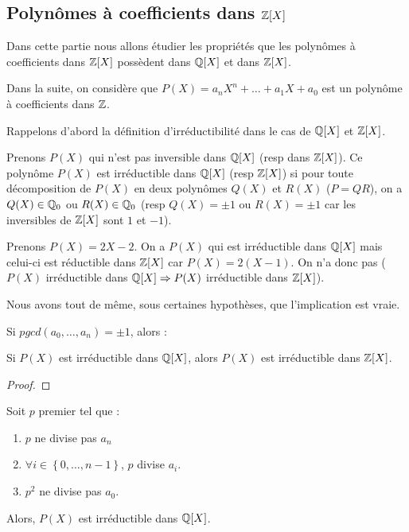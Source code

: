 \subsection{Polynômes à coefficients dans $\mathbb{Z}[X]$}

Dans cette partie nous allons étudier les propriétés que les polynômes à
coefficients dans $\mathbb{Z}[X]$ possèdent dans $\mathbb{Q}[X]$ et dans
$\mathbb{Z}[X]$.


Dans la suite, on considère que $P(X) = a_{n}X^{n} + \ldots + a_{1}X + a_{0}$
est un polynôme à coefficients dans $\mathbb{Z}$.

Rappelons d'abord la définition d'irréductibilité dans le cas de $\mathbb{Q}[X]$
et $\mathbb{Z}[X]$.

Prenons $P(X)$ qui n'est pas inversible dans $\mathbb{Q}[X]$ (resp dans
$\mathbb{Z}[X]$).
Ce polynôme $P(X)$ est irréductible dans $\mathbb{Q}[X]$ (resp $\mathbb{Z}[X]$) si
pour toute décomposition de $P(X)$ en deux polynômes $Q(X)$ et $R(X)$ ($P =
QR$), on a $Q(X) \in \mathbb{Q}_{0}$ ou $R(X) \in \mathbb{Q}_{0}$ (resp $Q(X) = \pm 1$
ou $R(X) = \pm 1$ car les inversibles de $\mathbb{Z}[X]$ sont $1$ et $-1$).

Prenons $P(X) = 2X-2$. On a $P(X)$ qui est irréductible dans
$\mathbb{Q}[X]$ mais celui-ci est réductible dans $\mathbb{Z}[X]$ car $P(X) =
2(X-1)$. On n'a donc pas ($P(X)$ irréductible dans $\mathbb{Q}[X] \Rightarrow
P(X)$ irréductible dans $\mathbb{Z}[X]$).

Nous avons tout de même, sous certaines hypothèses, que l'implication est vraie.

\begin{proposition}
	Si $pgcd(a_{0}, \ldots, a_{n}) = \pm 1$, alors :

	Si $P(X)$ est irréductible dans $\mathbb{Q}[X]$, alors $P(X)$ est
	irréductible dans $\mathbb{Z}[X]$.
\end{proposition}

\ifdefined\outputproof
\begin{proof}

\end{proof}
\fi

\begin{theorem} 

	Soit $p$ premier tel que :

	\begin{enumerate}
		\item $p$ ne divise pas $a_{n}$
		\item $\forall i \in \left\{ 0, \ldots, n - 1 \right\}$, $p$ divise
			$a_{i}$.
		\item $p^{2}$ ne divise pas $a_{0}$.
	\end{enumerate}
	\label{critere_E}
	Alors, $P(X)$ est irréductible dans $\mathbb{Q}[X]$.
\end{theorem}

